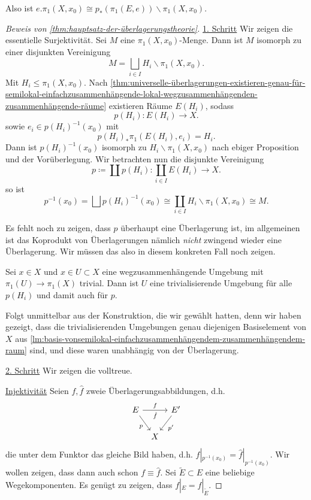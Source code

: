 Also ist $e.\pi_1(X,x_0) \cong p_*(\pi_1(E,e)) \backslash \pi_1(X,x_0)$.

\begin{proof}[Beweis von \autoref{thm:hauptsatz-der-überlagerungstheorie}]
    \underline{1. Schritt} Wir zeigen die essentielle Surjektivität. Sei $M$ eine  $\pi_1(X,x_0)$-Menge. Dann ist $M$ isomorph zu einer disjunkten Vereinigung
    \[
        M = \bigsqcup_{i\in I} H_i \backslash \pi_1(X,x_0)
    .\] 
    Mit $H_i \leq  \pi_1(X,x_0)$. Nach \autoref{thm:universelle-überlagerungen-existieren-genau-für-semilokal-einfachzusammenhängende-lokal-wegzusammenhängenden-zusammenhängende-räume} existieren Räume $E(H_i)$, sodass
     \[
         p(H_i) \colon  E(H_i) \to  X
    .\] 
    sowie $e_i\in p(H_i)^{-1}(x_0)$ mit 
    \[
        p(H_i)_* \pi_1(E(H_i),e_i) = H_i
    .\] 
    Dann ist $p(H_i)^{-1}(x_0)$ isomorph zu $H_i \backslash \pi_1(X,x_0)$ nach ebiger Proposition und der Vorüberlegung. Wir betrachten nun die disjunkte Vereinigung
    \[
        p\coloneqq  \coprod p(H_i) \colon  \coprod _{i \in I} E(H_i) \to  X
    .\] 
    so ist
    \[
        p^{-1} (x_0) = \bigsqcup p(H_i)^{-1}(x_0) \cong \coprod_{i \in I} H_i \backslash \pi_1(X,x_0) \cong M
    .\] 
    \begin{remark}
        Es fehlt noch zu zeigen, dass $p$ überhaupt eine Überlagerung ist, im allgemeinen ist das Koprodukt von Überlagerungen nämlich \textit{nicht} zwingend wieder eine Überlagerung. Wir müssen das also in diesem konkreten Fall noch zeigen.
    \end{remark}
    \begin{claim}
        Sei $x\in X$ und $x\in U\subset X$ eine wegzusammenhängende Umgebung mit $\pi_1(U) \to  \pi_1(X)$ trivial. Dann ist $U$ eine trivialisierende Umgebung für alle  $p(H_i)$ und damit auch für  $p$.
    \end{claim}
    \begin{subproof}
        Folgt unmittelbar aus der Konstruktion, die wir gewählt hatten, denn wir haben gezeigt, dass die trivialisierenden Umgebungen genau diejenigen Basiselement von $X$ aus  \autoref{lm:basis-vonsemilokal-einfachzusammenhängendem-zusammenhängendem-raum} sind, und diese waren unabhängig von der Überlagerung.
    \end{subproof}
    \underline{2. Schritt} Wir zeigen die volltreue.

    \underline{Injektivität} Seien $f,\hat{f}$ zweie Überlagerungsabbildungen, d.h.
    \[
    \begin{tikzcd}[column sep = tiny]
        E \ar{rr}{f}[swap]{\hat{f}} \ar[swap]{dr}{p} & & E' \ar{dl}{p'} \\
    & X
    \end{tikzcd}
    \]
    die unter dem Funktor das gleiche Bild haben, d.h. $f|_{p^{-1} (x_0)} = \hat{f}|_{p^{-1} (x_0)}$. Wir wollen zeigen, dass dann auch schon $f \equiv  \hat{f}$. Sei $\tilde{E} \subset E$ eine beliebige Wegekomponenten. Es genügt zu zeigen, dass $f|_E = \hat{f}|_{\tilde{E}}$.


\end{proof}

